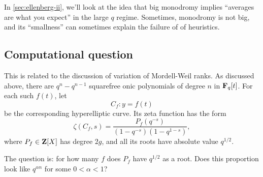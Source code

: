 In \autoref{sec:ellenberg-ii}, we'll look at the idea that big monodromy 
implies ``averages are what you expect'' in the large $q$ regime. Sometimes, 
monodromy is not big, and its ``smallness'' can sometimes explain the failure 
of of heuristics. 





\subsection{Computational question}

This is related to the discussion of variation of Mordell-Weil ranks. As 
discussed above, there are $q^n-q^{n-1}$ squarefree onic polynomials of degree 
$n$ in $\mathbf{F}_q[t]$. For each such $f(t)$, let 
\[
  C_f:y=f(t) 
\]
be the corresponding hyperelliptic curve. Its zeta function has the form 
\[
  \zeta(C_f,s) = \frac{P_f(q^{-s})}{(1-q^{-s})(1-q^{1-s})} ,
\]
where $P_f\in \mathbf{Z}[X]$ has degree $2 g$, and all its roots have absolute value 
$q^{1/2}$. 

The question is: for how many $f$ does $P_f$ have $q^{1/2}$ as a root. Does 
this proportion look like $q^{\alpha n}$ for some $0<\alpha<1$?




